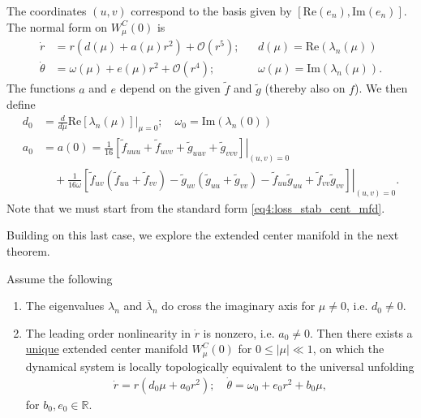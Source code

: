 \begin{enumerate}
The coordinates $(u,v)$ correspond to the basis given by $\left[  \textrm{Re} (e_n),  \textrm{Im} (e_n)\right]$. The normal form on $W^{C}_{\mu }(0)$ is
\begin{subequations}
\begin{align}
	\dot{r}&= r\left(d(\mu )+a(\mu )r^2\right) + \mathcal{O}(r^5); &&d(\mu )=  \textrm{Re} (\lambda _n(\mu )) \\
	\dot{\theta } &= \omega(\mu ) + e( \mu )r^2 + \mathcal{O}(r^4);&&\omega(\mu )=  \textrm{Im} (\lambda _n(\mu )).
\end{align}\end{subequations}
The functions $a$ and $e$ depend on the given $\tilde{f}$ and $\tilde{g}$ (thereby also on $f$). We then define
\begin{subequations}
\begin{align}
	d_0 &= \frac{d}{d\mu } \textrm{Re} \left.\left[ \lambda _n(\mu ) \right] \right|_{\mu =0}; 
		\quad \omega_0= \textrm{Im} (\lambda_n(0 ))\\
		a_0 &= a(0) = \frac{1}{16}\left. \left[\tilde{f}_{uuu} + \tilde{f}_{uvv} + \tilde{g}_{uuv} + \tilde{g}_{vvv}\right] \right|_{(u,v)=0} \\
		    &\quad +\frac{1}{16\omega } \left. \left[\tilde{f}_{uv}(\tilde{f}_{uu}+ \tilde{f}_{vv}) - \tilde{g}_{uv}(\tilde{g}_{uu}+\tilde{g}_{vv}) - \tilde{f}_{uu} \tilde{g}_{uu} + \tilde{f}_{vv}\tilde{g}_{vv}\right]\right|_{(u,v)=0}.
\end{align}
\end{subequations}
Note that we must start from the standard form \eqref{eq4:loss_stab_cent_mfd}. 
\end{enumerate}
Building on this last case, we explore the extended center manifold in the next theorem.

\begin{theorem}
	Assume the following
	\begin{enumerate}
		\item The eigenvalues $\lambda_n$ and $\overline{\lambda}_{n} $ do cross the imaginary axis for $\mu \neq 0$, i.e. $d_0 \neq 0$.
		\item The leading order nonlinearity in $\dot{r}$ is nonzero, i.e. $a_0 \neq 0$.
			Then there exists a \underline{unique} extended center manifold $W^{C}_{\mu }(0)$ for $0 \leq |\mu | \ll 1$, on which the dynamical system is locally topologically equivalent to the universal unfolding 
			\begin{align}
			\boxed{
			\dot{r} = r \left( d_0 \mu + a_0 r^2\right); \quad 
			\dot{\theta}= \omega_0 + e_0r^2 + b_0 \mu ,}
			\end{align}
		for $b_0, e_0 \in \mathbb{R}$.	
	\end{enumerate}
\end{theorem}


